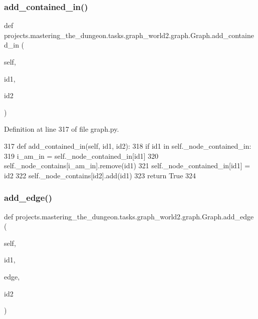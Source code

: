 \subsubsection{\texorpdfstring{add\+\_\+contained\+\_\+in()}{add\_contained\_in()}}
{\footnotesize\ttfamily def projects.\+mastering\+\_\+the\+\_\+dungeon.\+tasks.\+graph\+\_\+world2.\+graph.\+Graph.\+add\+\_\+contained\+\_\+in (\begin{DoxyParamCaption}\item[{}]{self,  }\item[{}]{id1,  }\item[{}]{id2 }\end{DoxyParamCaption})}



Definition at line 317 of file graph.\+py.


\begin{DoxyCode}
317     \textcolor{keyword}{def }add\_contained\_in(self, id1, id2):
318         \textcolor{keywordflow}{if} id1 \textcolor{keywordflow}{in} self.\_node\_contained\_in:
319             i\_am\_in = self.\_node\_contained\_in[id1]
320             self.\_node\_contains[i\_am\_in].remove(id1)
321         self.\_node\_contained\_in[id1] = id2
322         self.\_node\_contains[id2].add(id1)
323         \textcolor{keywordflow}{return} \textcolor{keyword}{True}
324 
\end{DoxyCode}
\mbox{\label{classprojects_1_1mastering__the__dungeon_1_1tasks_1_1graph__world2_1_1graph_1_1Graph_ab5b7564cd1ccd9e0ee7a047b077fc98a}} 
\subsubsection{\texorpdfstring{add\+\_\+edge()}{add\_edge()}}
{\footnotesize\ttfamily def projects.\+mastering\+\_\+the\+\_\+dungeon.\+tasks.\+graph\+\_\+world2.\+graph.\+Graph.\+add\+\_\+edge (\begin{DoxyParamCaption}\item[{}]{self,  }\item[{}]{id1,  }\item[{}]{edge,  }\item[{}]{id2 }\end{DoxyParamCaption})}



